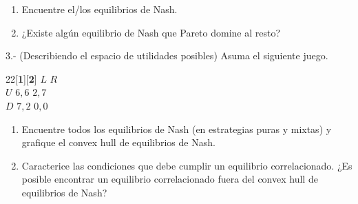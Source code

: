 \documentclass[11pt]{article}
\begin{document}
\begin{enumerate}
	\item Encuentre el/los equilibrios de Nash.
	\item ¿Existe alg\'un equilibrio de Nash que Pareto domine al resto?
\end{enumerate}

3.- (Describiendo el espacio de utilidades posibles) Asuma el siguiente juego.
\begin{center}
	 \begin{game}{2}{2}[\textbf{1}][\textbf{2}]
                  \>$L$         \>$R$      \\
        $U$       \>$6,6$       \>$2,7$    \\
        $D$       \>$7,2$       \>$0,0$     
 \end{game}
 \end{center}

\begin{enumerate}
	\item Encuentre todos los equilibrios de Nash (en estrategias puras y mixtas) y grafique el convex hull de equilibrios de Nash.
	\item Caracterice las condiciones que debe cumplir un equilibrio correlacionado. ¿Es posible encontrar un equilibrio correlacionado fuera del convex hull de equilibrios de Nash?
\end{enumerate}
\end{document}
